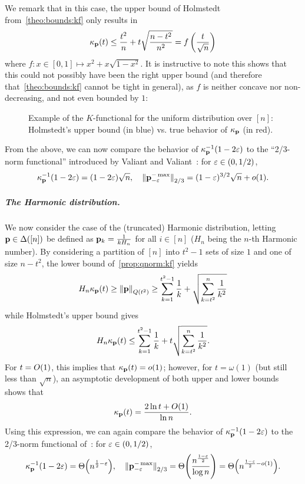 We remark that in this case, the upper bound of Holmstedt from~\cref{theo:bounds:kf} only results in
\[
    \kappa_{\mathbf{p}}(t) \leq  \frac{t^2}{n} + t\sqrt{\frac{n-t^2}{n^2}}  = f\left(\frac{t}{\sqrt{n}}\right)
\]
where $f\colon x\in [0,1]\mapsto x^2+x\sqrt{1-x^2}$. It is instructive to note this shows that this could not possibly have been the right upper bound (and therefore that~\cref{theo:bounds:kf} cannot be tight in general), as $f$ is neither concave nor non-decreasing, and not even bounded by $1$:
\begin{figure}[H]\centering
  \caption{Example of the $K$-functional for the uniform distribution over $[n]$: Holmstedt's upper bound (in blue) vs. true behavior of $\kappa_{\mathbf{p}}$ (in red).}
\end{figure}

From the above, we can now compare the behavior of $\kappa_{\mathbf{p}}^{-1}(1-2\varepsilon)$ to the ``2/3-norm functional'' introduced by Valiant and Valiant~\cite{VV:14}: for $\varepsilon\in(0,1/2)$,
\begin{equation}\label{eq:comparison:vv:1}
    \kf{\p}^{-1}(1-2\eps) = (1-2\eps)\sqrt{n}, \quad \norm{\p^{-\max}_{-\eps}}_{2/3} = (1-\eps)^{3/2} \sqrt{n} + \littleO{1}.
\end{equation}

\subparagraph{The Harmonic distribution.} We now consider the case of the (truncated) Harmonic distribution, letting $\mathbf{p}\in\Delta\!\left([n]\right)$ be defined as $\mathbf{p}_k = \frac{1}{k H_n}$ for all $i\in[n]$ ($H_n$ being the $n$-th Harmonic number). By considering a partition of $[n]$ into $t^2-1$ sets of size $1$ and one of size $n-t^2$, the lower bound of~\cref{prop:qnorm:kf} yields
\[
H_n \kappa_{\mathbf{p}}(t) \geq \lVert\mathbf{p}{\rVert}_{Q(t^2)} \geq \sum_{k=1}^{t^2-1} \frac{1}{k} + \sqrt{\sum_{k=t^2}^n \frac{1}{k^2}}
\]
while Holmstedt's upper bound gives
\[
H_n \kappa_{\mathbf{p}}(t) \leq \sum_{k=1}^{t^2-1} \frac{1}{k} + t\sqrt{\sum_{k=t^2}^n \frac{1}{k^2}}.
\]
For $t = \bigO{1}$, this implies that $\kf{\p}(t) = \littleO{1}$; however, for $t = \omega(1)$ (but still less than $\sqrt{n}$), an asymptotic development of both upper and lower bounds shows that
\[
    \kf{\p}(t) = \frac{2\ln t + \bigO{1}}{\ln n}.
\]
Using this expression, we can again compare the behavior of $\kappa_{\mathbf{p}}^{-1}(1-2\varepsilon)$ to the 2/3-norm functional of~\cite{VV:14}: for $\varepsilon\in(0,1/2)$,
\begin{equation}\label{eq:comparison:vv:2}
    \kf{\p}^{-1}(1-2\eps) = \bigTheta{n^{\frac{1}{2}-\eps}}, \quad \norm{\p^{-\max}_{-\eps}}_{2/3} = \bigTheta{\frac{n^{\frac{1-\eps}{2}}}{\log n}} = \bigTheta{n^{\frac{1-\eps}{2}-o(1)}}.
\end{equation}
 
